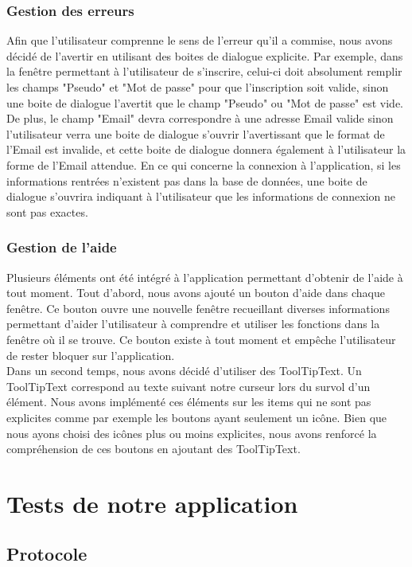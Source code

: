 \documentclass[11pt]{article}
\begin{document}
\subsubsection{Gestion des erreurs}
Afin que l'utilisateur comprenne le sens de l'erreur qu'il a commise, nous avons décidé de l'avertir en utilisant des boites de dialogue explicite. Par exemple, dans la fenêtre permettant à l'utilisateur de s'inscrire, celui-ci doit absolument remplir les champs "Pseudo" et "Mot de passe" pour que l'inscription soit valide, sinon une boite de dialogue l'avertit que le champ "Pseudo" ou "Mot de passe" est vide. De plus, le champ "Email" devra correspondre à une adresse Email valide sinon l'utilisateur verra une boite de dialogue s'ouvrir l'avertissant que le format de l'Email est invalide, et cette boite de dialogue donnera également à l'utilisateur la forme de l'Email attendue. En ce qui concerne la connexion à l'application, si les informations rentrées n'existent pas dans la base de données, une boite de dialogue s'ouvrira indiquant à l'utilisateur que les informations de connexion ne sont pas exactes.

\subsubsection{Gestion de l'aide}
Plusieurs éléments ont été intégré à l'application permettant d'obtenir de l'aide à tout moment. Tout d'abord, nous avons ajouté un bouton d'aide dans chaque fenêtre. Ce bouton ouvre une nouvelle fenêtre recueillant diverses informations permettant d'aider l'utilisateur à comprendre et utiliser les fonctions dans la fenêtre où il se trouve. Ce bouton existe à tout moment et empêche l'utilisateur de rester bloquer sur l'application.~\\
Dans un second temps, nous avons décidé d'utiliser des ToolTipText. Un ToolTipText correspond au texte suivant notre curseur lors du survol d'un élément. Nous avons implémenté ces éléments sur les items qui ne sont pas explicites comme par exemple les boutons ayant seulement un icône. Bien que nous ayons choisi des icônes plus ou moins explicites, nous avons renforcé la compréhension de ces boutons en ajoutant des ToolTipText.


\section{Tests de notre application}
\subsection{Protocole}
\end{document}
